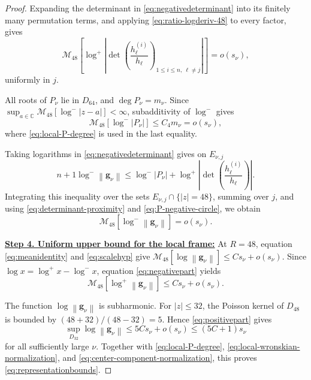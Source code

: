 \documentclass[12pt,letterpaper,reqno]{amsart}
\theoremstyle{definition}
\numberwithin{equation}{section}
\newcommand{\C}{\mathbb C}
\newcommand{\mean}[2]{\mathcal M_{#1}\!\left[#2\right]}
\newcommand{\norm}[1]{\left\lVert#1\right\rVert}
\newcommand{\gv}{\bm g}
\begin{document}
\begin{proof}
Expanding the determinant in \eqref{eq:negativedeterminant} into its
finitely many permutation terms, and applying
\eqref{eq:ratio-logderiv-48} to every factor, gives
\begin{equation}\label{eq:determinant-proximity}
 \mean{48}{
 \log^+
 \left|
 \det\left(
 \frac{h_\ell^{(i)}}{h_\ell}
 \right)_{
 1\leq i\leq n,\ \ell\ne j}
 \right|
 }
 =
 o(s_\nu),
\end{equation}
uniformly in \(j\).

All roots of \(P_\nu\) lie in \(D_{64}\), and
\(\deg P_\nu=m_\nu\). Since
\(\sup_{a\in\C}\mean{48}{\log^-|z-a|}<\infty\),
subadditivity of \(\log^-\) gives
\begin{equation}\label{eq:P-negative-circle}
 \mean{48}{\log^-|P_\nu|}
 \leq
 C_4m_\nu
 =
 o(s_\nu),
\end{equation}
where \eqref{eq:local-P-degree} is used in the last equality.

Taking logarithms in \eqref{eq:negativedeterminant} gives on
\(E_{\nu,j}\)
\[
 {n+1}\log^-\norm{\gv_\nu}
 \leq
 \log^-|P_\nu|
 +
 \log^+
 \left|
 \det\left(
 \frac{h_\ell^{(i)}}{h_\ell}
 \right)
 \right|.
\]
Integrating this inequality over the sets \(E_{\nu,j}\cap\{|z|=48\}\),
summing over \(j\), and using
\eqref{eq:determinant-proximity} and
\eqref{eq:P-negative-circle}, we obtain
\begin{equation}\label{eq:negativepart}
 \mean{48}{\log^-\norm{\gv_\nu}}
 =
 o(s_\nu).
\end{equation}


\medskip\noindent
\textbf{\underline{Step 4. Uniform upper bound for the local frame:}}
At \(R=48\), equation \eqref{eq:meanidentity} and
\eqref{eq:scalehyp} give
\(\mean{48}{\log\norm{\gv_\nu}}\leq Cs_\nu+o(s_\nu)\).
Since
\(\log x=\log^+x-\log^-x\),
equation \eqref{eq:negativepart} yields
\begin{equation}\label{eq:positivepart}
 \mean{48}{\log^+\norm{\gv_\nu}}
 \leq
 Cs_\nu+o(s_\nu).
\end{equation}

The function \(\log\norm{\gv_\nu}\) is subharmonic. For
\(|z|\leq32\), the Poisson kernel of \(D_{48}\) is bounded by
\((48+32)/(48-32)=5\). Hence \eqref{eq:positivepart} gives
\[
 \sup_{D_{32}}\log\norm{\gv_\nu}
 \leq
 5Cs_\nu+o(s_\nu)
 \leq
 (5C+1)s_\nu
\]
for all sufficiently large \(\nu\). Together with
\eqref{eq:local-P-degree},
\eqref{eq:local-wronskian-normalization}, and
\eqref{eq:center-component-normalization}, this proves
\eqref{eq:representationbounds}.



\end{proof}
\end{document}
